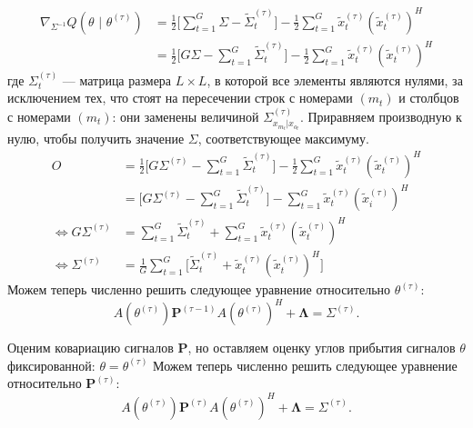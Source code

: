 \documentclass[11pt]{article}
\begin{document}
\begin{align*}
\nabla_{\Sigma^{-1}} Q(\theta \text{ | } \theta^{(\tau)}) &= \frac{1}{2} \big[ \sum_{t = 1}^{G} \Sigma -  \widetilde{\Sigma}_{t}^{(\tau)} \big] - \frac{1}{2} \sum_{t = 1}^{G} \widetilde{x}_t^{(\tau)}(\widetilde{x}_t^{(\tau)})^H \\
&= \frac{1}{2} \big[ G \Sigma - \sum_{t = 1}^{G} \widetilde{\Sigma}_{t}^{(\tau)} \big] - \frac{1}{2} \sum_{t = 1}^{G} \widetilde{x}_t^{(\tau)}(\widetilde{x}_t^{(\tau)})^H
\end{align*}
где $\Sigma_{t}^{(\tau)}$ --- матрица размера $L \times L$, в которой все элементы являются нулями, за исключением тех, что стоят на пересечении строк с номерами $(m_t)$ и столбцов с номерами $(m_t)$: они заменены величиной $\Sigma^{(\tau)}_{x_{m_t}|x_{o_t}}$.
Приравняем производную к нулю, чтобы получить значение $\Sigma$, соответствующее максимуму.
\begin{align*}
O &= \frac{1}{2} \big[ G \Sigma^{(\tau)} - \sum_{t = 1}^{G} \widetilde{\Sigma}_{t}^{(\tau)} \big] - \frac{1}{2} \sum_{t = 1}^{G} \widetilde{x}_t^{(\tau)}(\widetilde{x}_t^{(\tau)})^H \\
&= \big[ G \Sigma^{(\tau)} - \sum_{t = 1}^{G} \widetilde{\Sigma}_{t}^{(\tau)} \big] - \sum_{t = 1}^{G} \widetilde{x}_t^{(\tau)}(\widetilde{x}_i^{(\tau)})^H \\
\iff G \Sigma^{(\tau)} &= \sum_{t = 1}^{G} \widetilde{\Sigma}_{t}^{(\tau)} + \sum_{t = 1}^{G} \widetilde{x}_t^{(\tau)}(\widetilde{x}_t^{(\tau)})^H \\
\iff \Sigma^{(\tau)} &= \frac{1}{G} \sum_{t = 1}^{G} \Big[ \widetilde{\Sigma}_{t}^{(\tau)} + \widetilde{x}_t^{(\tau)}(\widetilde{x}_t^{(\tau)})^H \Big]
\end{align*}
Можем теперь численно решить следующее уравнение относительно $\theta^{(\tau)}$:
\begin{equation}
A(\theta^{(\tau)})\mathbf{P}^{(\tau-1)}A(\theta^{(\tau)})^H + \mathbf{\Lambda} = \Sigma^{(\tau)}.
\end{equation}
\begin{center}
\fontsize{14}{18}\selectfont {}
\end{center}
Оценим ковариацию сигналов $\mathbf{P}$, но оставляем оценку углов прибытия сигналов $\theta$ фиксированной: $\theta = \theta^{(\tau)}$
Можем теперь численно решить следующее уравнение относительно $\mathbf{P}^{(\tau)}$:
\begin{equation}
A(\theta^{(\tau)})\mathbf{P}^{(\tau)}A(\theta^{(\tau)})^H + \mathbf{\Lambda} = \Sigma^{(\tau)}.
\end{equation}
\end{document}
